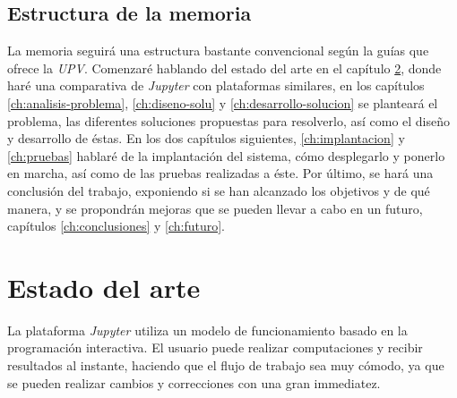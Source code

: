 \documentclass[11pt,spanish,listoffigures]{tfgetsinf}
\begin{document}

\section{Estructura de la memoria}
\label{sec:estructura}

La memoria seguirá una estructura bastante convencional según la guías que ofrece la \textit{UPV}. Comenzaré hablando del estado del arte en el capítulo \ref{ch:state-of-art}, donde haré una comparativa de \textit{Jupyter} con plataformas similares, en los capítulos \ref{ch:analisis-problema}, \ref{ch:diseno-solu} y \ref{ch:desarrollo-solucion} se planteará el problema, las diferentes soluciones propuestas para resolverlo, así como el diseño y desarrollo de éstas. En los dos capítulos siguientes, \ref{ch:implantacion} y \ref{ch:pruebas} hablaré de la implantación del sistema, cómo desplegarlo y ponerlo en marcha, así como de las pruebas realizadas a éste. Por último, se hará una conclusión del trabajo, exponiendo si se han alcanzado los objetivos y de qué manera, y se propondrán mejoras que se pueden llevar a cabo en un futuro, capítulos \ref{ch:conclusiones} y \ref{ch:futuro}. 







\chapter{Estado del arte}
\label{ch:state-of-art}

La plataforma \textit{Jupyter} utiliza un modelo de funcionamiento basado en la programación interactiva. El usuario puede realizar computaciones y recibir resultados al instante, haciendo que el flujo de trabajo sea muy cómodo, ya que se pueden realizar cambios y correcciones con una gran immediatez.
\end{document}
